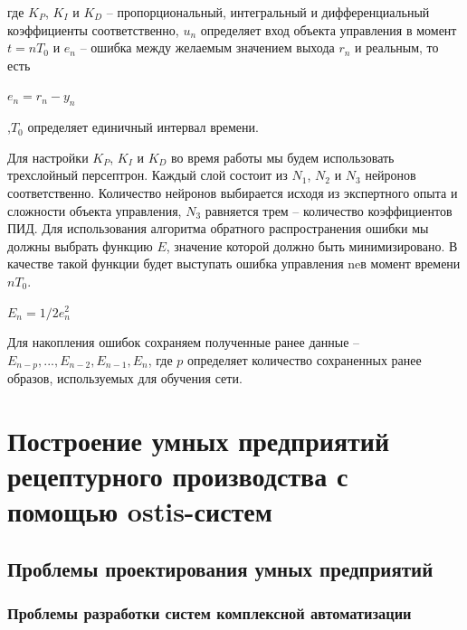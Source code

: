 где $K_P$, $K_I$ и $K_D$ – пропорциональный, интегральный и дифференциальный коэффициенты соответственно, $u_n$ определяет вход объекта управления в момент $t = nT_0$ и $e_n$ – ошибка между желаемым значением выхода $r_n$ и реальным, то есть 

$e_n = r_n - y_n $

,$T_0$ определяет единичный интервал времени. 

Для настройки $K_P$, $K_I$ и $K_D$ во время работы мы будем использовать  трехслойный  персептрон.  Каждый  слой  состоит  из $N_1$, $N_2$ и $N_3$ нейронов соответственно. Количество нейронов выбирается  исходя  из  экспертного  опыта  и  сложности  объекта  управления, $N_3$ равняется трем – количество коэффициентов ПИД. Для использования алгоритма обратного распространения ошибки мы должны выбрать функцию $E$, значение которой должно быть минимизировано. В качестве такой функции будет выступать ошибка управления neв момент времени $nT_0$.

$E_n = 1/2 e^2_n$ 

Для накопления ошибок сохраняем полученные ранее данные – $E_{n-p}, ..., E_{n-2},E_{n-1},E_n$,  где $p$  определяет  количество  сохраненных ранее образов, используемых для обучения сети.



\section{Построение умных предприятий рецептурного производства с помощью ostis-систем}


\subsection{Проблемы проектирования умных предприятий}


\subsubsection{Проблемы разработки систем комплексной автоматизации}


